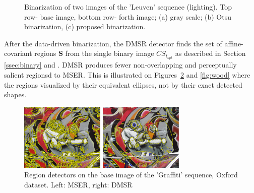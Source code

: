 \documentclass[conference,compsoc]{IEEEtran}
\def\S{{\mathbf S}}
\begin{document}
\begin{figure}[htb]
 \vspace{-0.5cm}
\caption{Binarization of two images of the 'Leuven' sequence (lighting). Top row- base image, bottom row- forth image;   (a) gray scale; (b) Otsu binarization, (c) proposed binarization.}
\label{fig:leuven_bin}
%
\end{figure}

After the data-driven binarization, the DMSR detector finds the set of affine-covariant regions $\S$ from the single binary image $CS_{t_{opt}}$ as described in Section \ref{ssec:binary} and \cite{RangMSSR06, RangHumpb06}. DMSR produces fewer non-overlapping and perceptually salient regionsd to MSER. This is illustrated on  Figures~\ref{fig:det_graffiti} and \ref{fig:wood} where the regions visualized by their equivalent ellipses, not by their exact detected shapes.

\begin{figure}[htb]

\begin{minipage}[b]{.49\linewidth}
  \centering
  \centerline{\includegraphics[width=4.0cm]{mserGraffiti1}}
\end{minipage}
\hfill
\begin{minipage}[b]{0.49\linewidth}
  \centering
  \centerline{\includegraphics[width=4.0cm]{dmsrGraffiti1}}
\end{minipage}
\vspace{-0.25cm}
\caption{Region detectors on the base image of the 'Graffiti' sequence, Oxford dataset. Left: MSER, right: DMSR}
\label{fig:det_graffiti}
%
\end{figure}
\end{document}

